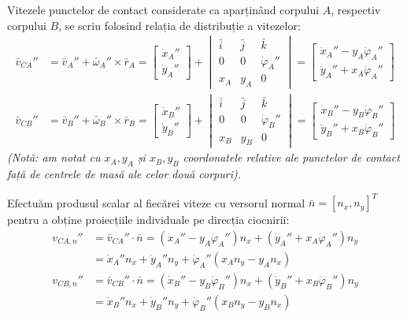 \documentclass[12pt, a4paper]{article}
\begin{document}
Vitezele punctelor de contact considerate ca aparținând corpului $A$, respectiv corpului $B$, se scriu folosind relația de distribuție a vitezelor:
\begin{equation}
    \begin{aligned}
        \bar{v}_{CA}'' &= \bar{v}_A'' + \bar{\omega}_A'' \times \bar{r}_{A} = \begin{bmatrix} \dot{x}_A'' \\ \dot{y}_A'' \end{bmatrix} + \begin{vmatrix} \bar{i} & \bar{j} & \bar{k} \\ 0 & 0 & \dot{\varphi}_A'' \\ x_{A} & y_{A} & 0 \end{vmatrix} = \begin{bmatrix} \dot{x}_A'' - y_{A} \dot{\varphi}_A'' \\ \dot{y}_A'' + x_{A} \dot{\varphi}_A'' \end{bmatrix} \\
        \bar{v}_{CB}'' &= \bar{v}_B'' + \bar{\omega}_B'' \times \bar{r}_{B} = \begin{bmatrix} \dot{x}_B'' \\ \dot{y}_B'' \end{bmatrix} + \begin{vmatrix} \bar{i} & \bar{j} & \bar{k} \\ 0 & 0 & \dot{\varphi}_B'' \\ x_{B} & y_{B} & 0 \end{vmatrix} = \begin{bmatrix} \dot{x}_B'' - y_{B} \dot{\varphi}_B'' \\ \dot{y}_B'' + x_{B} \dot{\varphi}_B'' \end{bmatrix}
    \end{aligned}
\end{equation}
\textit{(Notă: am notat cu $x_{A}, y_{A}$ și $x_{B}, y_{B}$ coordonatele relative ale punctelor de contact față de centrele de masă ale celor două corpuri).}

Efectuăm produsul scalar al fiecărei viteze cu versorul normal $\bar{n} = [n_x, n_y]^T$ pentru a obține proiecțiile individuale pe direcția ciocnirii:
\begin{equation}
    \begin{aligned}
        v_{CA,n}'' &= \bar{v}_{CA}'' \cdot \bar{n} = (\dot{x}_A'' - y_A \dot{\varphi}_A'')n_x + (\dot{y}_A'' + x_A \dot{\varphi}_A'')n_y \\
                   &= \dot{x}_A'' n_x + \dot{y}_A'' n_y + \dot{\varphi}_A''(x_A n_y - y_A n_x) \\
        v_{CB,n}'' &= \bar{v}_{CB}'' \cdot \bar{n} = (\dot{x}_B'' - y_B \dot{\varphi}_B'')n_x + (\dot{y}_B'' + x_B \dot{\varphi}_B'')n_y \\
                   &= \dot{x}_B'' n_x + \dot{y}_B'' n_y + \dot{\varphi}_B''(x_B n_y - y_B n_x)
    \end{aligned}
\end{equation}
\end{document}
